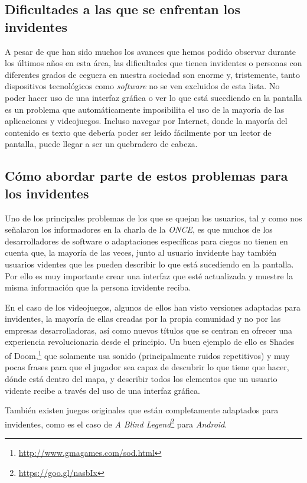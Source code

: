 \subsection{Dificultades a las que se enfrentan los invidentes}

A pesar de que han sido muchos los avances que hemos podido observar durante los últimos años en esta área, las dificultades que tienen invidentes o personas con diferentes grados de ceguera en nuestra sociedad son enorme y, tristemente, tanto dispositivos tecnológicos como \textit{software} no se ven excluidos de esta lista.
No poder hacer uso de una interfaz gráfica o ver lo que está sucediendo en la pantalla es un problema que automáticamente imposibilita el uso de la mayoría de las aplicaciones y videojuegos. Incluso navegar por Internet, donde la mayoría del contenido es texto que debería poder ser leído fácilmente por un lector de pantalla, puede llegar a ser un quebradero de cabeza.

\subsection{Cómo abordar parte de estos problemas para los invidentes}

Uno de los principales problemas de los que se quejan los usuarios, tal y como nos señalaron los informadores en la charla de la \textit{ONCE}, es que muchos de los desarrolladores de software o adaptaciones específicas para ciegos no tienen en cuenta que, la mayoría de las veces, junto al usuario invidente hay también usuarios videntes que les pueden describir lo que está sucediendo en la pantalla. Por ello es muy importante crear una interfaz que esté actualizada y muestre la misma información que la persona invidente reciba.

En el caso de los videojuegos, algunos de ellos han visto versiones adaptadas para invidentes, la mayoría de ellas creadas por la propia comunidad y no por las empresas desarrolladoras, así como nuevos títulos que se centran en ofrecer una experiencia revolucionaria desde el principio. Un buen ejemplo de ello es Shades of Doom,\footnote{\url{http://www.gmagames.com/sod.html}} que solamente usa sonido (principalmente ruidos repetitivos) y muy pocas frases para que el jugador sea capaz de descubrir lo que tiene que hacer, dónde está dentro del mapa, y describir todos los elementos que un usuario vidente recibe a través del uso de una interfaz gráfica.

También existen juegos originales que están completamente adaptados para invidentes, como es el caso de \textit{A Blind Legend}\footnote{\url{https://goo.gl/nasbIx}} para \textit{Android}.

